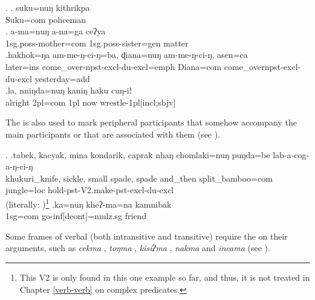 \ex. \ag.  suku=nuŋ   kithrikpa\\
Suku{\sc =com} policeman\\
 
		\bg. a-ma=nuŋ                a-na=ga                       ceʔya\\
{\sc 1sg.poss-}mother{\sc=com} {\sc 1sg.poss-}sister{\sc=gen} matter\\
		\bg.hakhok=ŋa  am-me-ŋ-ci-ŋ=ba,                          ɖiana=nuŋ     am-me-ŋ-ci-ŋ,                      asen=ca\\
		later{\sc =ins} come\_over{\sc -npst-excl-du-excl=emph} Diana{\sc =com} come\_over{\sc npst-excl-du-excl} yesterday{\sc =add}\\
		\bg.la,    nniŋda=nuŋ   kaniŋ haku cuŋ-iǃ\\
		alright {\sc 2pl=com} {\sc 1pl} now wrestle{\sc -1pl[incl;sbjv]}\\
			
The  is also used to mark peripheral participants that somehow accompany the main participants or that are associated with them (see \Next).

\ex. \ag.tabek,                 kacyak, mina  kondarik,               caprak                 nhaŋ    chomlaki=nuŋ       puŋda=be    lab-a-cog-a-ŋ-ci-ŋ\\
khukuri\_knife, sickle, small spade, spade and\_then split\_bamboo{\sc =com}  jungle{\sc =loc} hold{\sc -pst-V2.make-pst-excl-du-excl}\\
 (literally: )\footnote{This V2 is only found in this one example so far, and thus, it is not treated in Chapter \ref{verb-verb} on complex predicates.} 
\bg.ka=nuŋ kheʔ-ma=na kamnibak\\
{\sc 1sg=com} go{\sc -inf[deont]=nmlz.sg} friend\\
		
Some frames of verbal  (both intransitive and transitive) require the  on their arguments, such as \emph{cekma} , \emph{toŋma} , \emph{kisiʔma} , \emph{nakma}  and \emph{incama}  (see \Next).		
				
